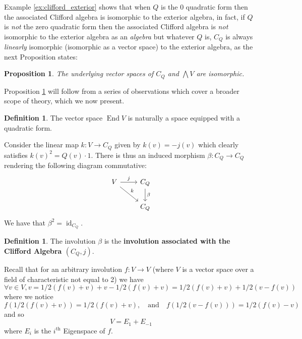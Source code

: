 \documentclass[12pt]{article}
\theoremstyle{plain}
\newtheorem{proposition}[thm]{Proposition}
\theoremstyle{definition}
\newtheorem{defn}[thm]{Definition} %
\newcommand{\lto}{\longrightarrow}
\begin{document}
	Example \ref{ex:clifford_exterior} shows that when $Q$ is the 0 quadratic form then the associated Clifford algebra is isomorphic to the exterior algebra, in fact, if $Q$ is \emph{not} the zero quadratic form then the associated Clifford algebra is \emph{not} isomorphic to the exterior algebra as an \emph{algebra} but whatever $Q$ is, $C_Q$ is always \emph{linearly} isomorphic (isomorphic as a vector space) to the exterior algebra, as the next Proposition states:
	\begin{proposition}\label{prop:linear_iso}
		The underlying vector spaces of $C_Q$ and $\bigwedge V$ are isomorphic.
	\end{proposition}
	Proposition \ref{prop:linear_iso} will follow from a series of observations which cover a broader scope of theory, which we now present.
	\begin{defn}
		The vector space $\operatorname{End}V$ is naturally a space equipped with a quadratic form.
	\end{defn}
	
	Consider the linear map $k: V \lto C_Q$ given by $k(v) = -j(v)$ which clearly satisfies $k(v)^2 = Q(v)\cdot 1$. There is thus an induced morphism $\beta: C_Q \lto C_Q$ rendering the following diagram commutative:
	\begin{equation}
		\begin{tikzcd}
			V\arrow[r,"j"]\arrow[dr,"k"] & C_Q\arrow[d,"\beta"]\\
			& C_Q
		\end{tikzcd}
	\end{equation}
	We have that $\beta^2 = \operatorname{id}_{C_Q}$. 
	
	\begin{defn}
		The involution $\beta$ is the \textbf{involution associated with the Clifford Algebra $(C_Q,j)$}.
	\end{defn}
	Recall that for an arbitrary involution $f: V \lto V$ (where $V$ is a vector space over a field of characteristic not equal to 2) we have
	\begin{equation}
		\forall v \in V, v = 1/2(f(v) + v) + v - 1/2(f(v) + v) = 1/2(f(v) + v) + 1/2(v - f(v))
	\end{equation}
	where we notice
	\begin{equation}
		f(1/2(f(v) + v)) = 1/2(f(v) + v),\quad \text{and}\quad f(1/2(v - f(v))) = 1/2(f(v) - v)
	\end{equation}
	and so
	\begin{equation}
		V = E_1 + E_{-1}
	\end{equation}
	where $E_i$ is the $i^\text{th}$ Eigenspace of $f$. 
	
\end{document}
